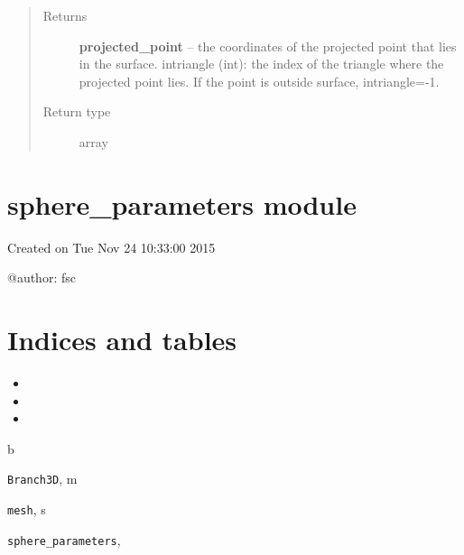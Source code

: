 \documentclass[letterpaper,10pt,english]{sphinxmanual}
\begin{document}
\begin{fulllineitems}
\begin{fulllineitems}
\begin{quote}
\begin{description}
\item[{Returns}] \leavevmode
\textbf{projected\_point} --
the coordinates of the projected point that lies in the surface.
intriangle (int): the index of the triangle where the projected point lies. If the point is outside surface, intriangle=-1.

\item[{Return type}] \leavevmode
array

\end{description}\end{quote}

\end{fulllineitems}


\end{fulllineitems}



\chapter{sphere\_parameters module}
\label{sphere_parameters::doc}\label{sphere_parameters:module-sphere_parameters}\label{sphere_parameters:sphere-parameters-module}
Created on Tue Nov 24 10:33:00 2015

@author: fsc

\begin{fulllineitems}
\label{sphere_parameters:sphere_parameters.Parameters}
\end{fulllineitems}



\chapter{Indices and tables}
\label{index:indices-and-tables}\begin{itemize}
\item {} 

\item {} 

\item {} 

\end{itemize}


\renewcommand{\indexname}{Python Module Index}
\begin{theindex}
\def\bigletter#1{{\Large\sffamily#1}\nopagebreak\vspace{1mm}}
\bigletter{b}
\item {\texttt{Branch3D}}, \pageref{Branch3D:module-Branch3D}
\indexspace
\bigletter{m}
\item {\texttt{mesh}}, \pageref{mesh:module-mesh}
\indexspace
\bigletter{s}
\item {\texttt{sphere\_parameters}}, \pageref{sphere_parameters:module-sphere_parameters}
\end{theindex}

\renewcommand{\indexname}{Index}
\printindex
\end{document}
